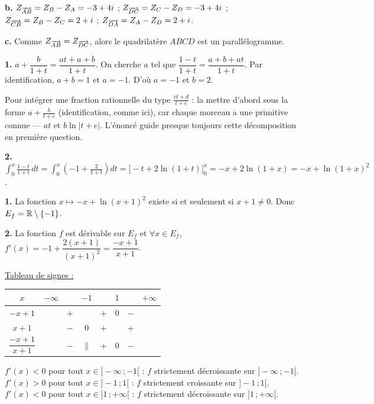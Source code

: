 \documentclass[11pt]{article}
\begin{document}
\textbf{b.} $Z_{\overrightarrow{AB}} = Z_B - Z_A = -3 + 4i$ ; $Z_{\overrightarrow{DC}} = Z_C - Z_D = -3 + 4i$ ; $Z_{\overrightarrow{CB}} = Z_B - Z_C = 2 + i$ ; $Z_{\overrightarrow{DA}} = Z_A - Z_D = 2 + i$.

\textbf{c.} Comme $Z_{\overrightarrow{AB}} = Z_{\overrightarrow{DC}}$, alors le quadrilatère $ABCD$ est un parallélogramme.

\prob{}

\textbf{1.} $a + \dfrac{b}{1 + t} = \dfrac{at + a + b}{1 + t}$. On cherche $a$ tel que $\dfrac{1 - t}{1 + t} = \dfrac{a + b + at}{1 + t}$. Par identification, $a + b = 1$ et $a = -1$. D'où $a = -1$ et $b = 2$.

\begin{methode}
Pour intégrer une fraction rationnelle du type
$\frac{ct + d}{t + e}$ : la mettre d'abord sous la forme
$a + \frac{b}{t + e}$ (identification, comme ici), car chaque morceau
a une primitive connue — $at$ et $b\ln|t + e|$. L'énoncé guide presque
toujours cette décomposition en première question.
\end{methode}

\textbf{2.} $\displaystyle\int_0^x \frac{1 - t}{1 + t}\,dt = \int_0^x \left(-1 + \frac{2}{1 + t}\right)dt = \Big[-t + 2\ln(1 + t)\Big]_0^x = -x + 2\ln(1 + x) = -x + \ln(1 + x)^2$.

\textbf{1.} La fonction $x \mapsto -x + \ln(x + 1)^2$ existe si et seulement si $x + 1 \ne 0$. Donc $E_f = \mathbb{R} \setminus \{-1\}$.

\textbf{2.} La fonction $f$ est dérivable sur $E_f$ et $\forall x \in E_f$, $f'(x) = -1 + \dfrac{2(x + 1)}{(x + 1)^2} = \dfrac{-x + 1}{x + 1}$.

\underline{Tableau de signes :}
\begin{center}\renewcommand{\arraystretch}{1.4}
\begin{tabular}{|c|ccccccc|}
\hline
$x$ & $-\infty$ & & $-1$ & & $1$ & & $+\infty$ \\
\hline
$-x + 1$ & & $+$ & & $+$ & $0$ & $-$ & \\
\hline
$x + 1$ & & $-$ & $0$ & $+$ & & $+$ & \\
\hline
$\dfrac{-x + 1}{x + 1}$ & & $-$ & $\|$ & $+$ & $0$ & $-$ & \\
\hline
\end{tabular}
\end{center}
$f'(x) < 0$ pour tout $x \in ]-\infty\,;-1[$ : $f$ strictement décroissante sur $]-\infty\,;-1[$. $f'(x) > 0$ pour tout $x \in ]-1\,;1[$ : $f$ strictement croissante sur $]-1\,;1[$. $f'(x) < 0$ pour tout $x \in ]1\,;+\infty[$ : $f$ strictement décroissante sur $]1\,;+\infty[$.
\end{document}
